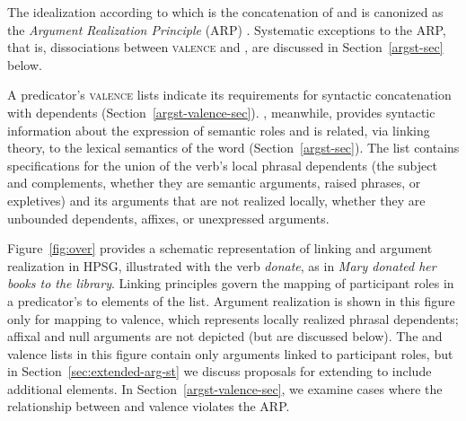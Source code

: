 \documentclass[output=paper
 	        ,biblatex
                ,babelshorthands
                ,newtxmath
                ,draftmode
                ,colorlinks, citecolor=brown
]{langscibook}
\begin{document}
\noindent
The idealization according to which \argst is the concatenation of \subj and \comps is canonized as
the \emph{Argument Realization Principle} (ARP)
\citep[494]{SWB2003a}.  Systematic exceptions to the ARP, that is, dissociations between
\textsc{valence} and \argst, are discussed in Section~\ref{argst-sec} below.

A predicator's \textsc{valence} lists indicate its requirements for syntactic concatenation with dependents (Section~\ref{argst-valence-sec}).  \argst, meanwhile, provides syntactic
information about the expression of semantic roles and is related, via linking theory, to the
lexical semantics of the word (Section~\ref{argst-sec}).  The \argst list contains specifications
for the union of the verb's local phrasal dependents (the subject and complements, whether they are
semantic arguments, raised phrases, or expletives) and its arguments that are not realized locally,
whether they are unbounded dependents, affixes, or unexpressed
arguments.

Figure~\ref{fig:over} provides a schematic representation of %
linking and argument realization in HPSG,  illustrated with the verb \textit{donate}, as in
\textit{Mary donated her books to the library}.   Linking principles govern the mapping of
participant roles in a predicator's \content to %
elements of the \argst list.   Argument realization
is shown in this figure only for mapping to valence, which represents locally realized phrasal
dependents; affixal and null arguments are not depicted (but are discussed below). 
The \argst and valence lists in this figure contain only arguments linked to participant
roles,  but in
Section~\ref{sec:extended-arg-st} we discuss proposals for extending \argst to include additional
elements. In Section~\ref{argst-valence-sec}, we examine cases where the relationship between \argst
and valence violates the ARP.
\end{document}
